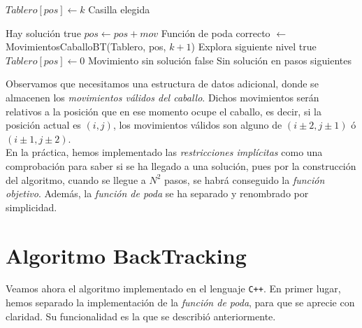 \documentclass[11pt]{article}
\begin{document}
\begin{algorithm}[H]
\begin{algorithmic}

     \State $Tablero[pos] \gets k$ \Comment Casilla elegida

      \Comment Hay solución
     	\State \Return true
    	\EndIf
         \State $pos \gets pos + mov$
          \Comment Función de poda
         	\State correcto $\gets$ MovimientosCaballoBT(Tablero, pos, $k+1$) \Comment 						Explora siguiente nivel
         		\State \Return true
         	\Else
         		\State $Tablero[pos] \gets 0$ \Comment Movimiento sin solución
         	\EndIf
         \EndIf
      \EndFor
     \State \Return false \Comment  Sin solución en pasos siguientes
  \EndFunction
\end{algorithmic}
\end{algorithm}

Observamos que necesitamos una estructura de datos adicional, donde se almacenen los \textit{movimientos válidos del caballo}. Dichos movimientos serán relativos a la posición que en ese momento ocupe el caballo, es decir, si la posición actual es $(i,j)$, los movimientos válidos son alguno de $(i \pm 2, j \pm 1)$ ó $(i \pm 1, j \pm 2)$.\\

En la práctica, hemos implementado las \textit{restricciones implícitas} como una comprobación para saber si se ha llegado a una solución, pues por la construcción del algoritmo, cuando se llegue a $N^2$ pasos, se habrá conseguido la \textit{función objetivo}. Además, la \textit{función de poda} se ha separado y renombrado por simplicidad.

\section*{Algoritmo BackTracking}

Veamos ahora el algoritmo implementado en el lenguaje \verb|C++|. En primer lugar, hemos separado la implementación de la \textit{función de poda}, para que se aprecie con claridad. Su funcionalidad es la que se describió anteriormente.

	
\vspace{1em}
\end{document}
